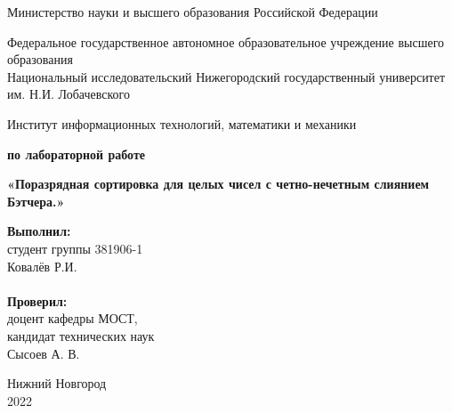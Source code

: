 \documentclass{report}
\begin{document}
\begin{titlepage}

\begin{center}
Министерство науки и высшего образования Российской Федерации
\end{center}

\begin{center}
Федеральное государственное автономное образовательное учреждение высшего образования \\
Национальный исследовательский Нижегородский государственный университет им. Н.И. Лобачевского
\end{center}

\begin{center}
Институт информационных технологий, математики и механики
\end{center}

\vspace{4em}

\begin{center}
\textbf{ по лабораторной работе} \\
\end{center}
\begin{center}
\textbf{\Large«Поразрядная сортировка для целых чисел с четно-нечетным слиянием Бэтчера.»} \\
\end{center}

\vspace{4em}

\newbox{\lbox}
\newlength{\maxl}
\setlength{\maxl}{\wd\lbox}
\hfill\parbox{7cm}{
\hspace*{5cm}\hspace*{-5cm}\textbf{Выполнил:} \\ студент группы 381906-1 \\ Ковалёв Р.И.\\
\\
\hspace*{5cm}\hspace*{-5cm}\textbf{Проверил:}\\ доцент кафедры МОСТ, \\ кандидат технических наук \\ Сысоев А. В.\\
}
\vspace{\fill}

\begin{center} Нижний Новгород \\ 2022 \end{center}

\end{titlepage}
\end{document}
